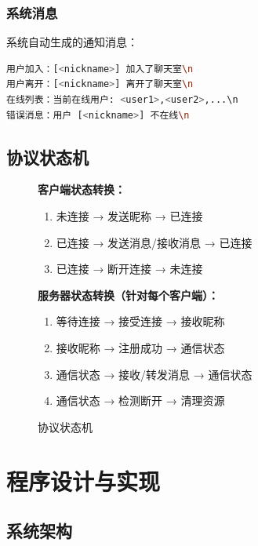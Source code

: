 \documentclass[12pt, a4paper]{article}
\begin{document}
\subsubsection{系统消息}

系统自动生成的通知消息：

\begin{lstlisting}[language=bash]
用户加入：[<nickname>] 加入了聊天室\n
用户离开：[<nickname>] 离开了聊天室\n
在线列表：当前在线用户: <user1>,<user2>,...\n
错误消息：用户 [<nickname>] 不在线\n
\end{lstlisting}


\subsection{协议状态机}

\begin{figure}[H]
    \centering
    \begin{tcolorbox}[width=0.9\textwidth]
    \textbf{客户端状态转换：}
    \begin{enumerate}[itemsep=2pt]
      \item 未连接 → 发送昵称 → 已连接
      \item 已连接 → 发送消息/接收消息 → 已连接
      \item 已连接 → 断开连接 → 未连接
    \end{enumerate}
    
    \vspace{5pt}
    \textbf{服务器状态转换（针对每个客户端）：}
    \begin{enumerate}[itemsep=2pt]
      \item 等待连接 → 接受连接 → 接收昵称
      \item 接收昵称 → 注册成功 → 通信状态
      \item 通信状态 → 接收/转发消息 → 通信状态
      \item 通信状态 → 检测断开 → 清理资源
    \end{enumerate}
    \end{tcolorbox}
    \caption{协议状态机}
\end{figure}

\section{程序设计与实现}

\subsection{系统架构}
\end{document}
